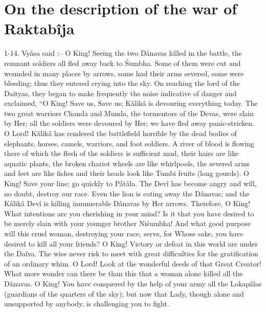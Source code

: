 ﻿\chapter{On the description of the war of Raktab\^ija}

1-14. Vy\^asa said :-- O King! Seeing the two D\^anavas killed in the battle, the remnant soldiers all fled away back to \'Sumbha. Some of them were cut and wounded in many places by arrows, some had their arms severed, some were bleeding; thus they entered crying into the sky. On reaching the lord of the Daityas, they began to make frequently the noise indicative of danger and exclaimed, ``O King! Save us, Save us; K\^alik\^a is devouring everything today. The two great warriors Chanda and Munda, the tormentors of the Devas, were slain by Her; all the soldiers were devoured by Her; we have fled away panic-stricken. O Lord! K\^alik\^a has rendered the battlefield horrible by the dead bodies of elephants, horses, camels, warriors, and foot soldiers. A river of blood is flowing there of which the flesh of the soldiers is sufficient mud, their hairs are like aquatic plants, the broken chariot wheels are like whirlpools, the severed arms and feet are like fishes and their heads look like Tumbi fruits (long gourds). O King! Save your line; go quickly to P\^at\^ala. The Dev\^i has become angry and will, no doubt, destroy our race. Even the lion is eating away the D\^anavas; and the K\^alik\^a Dev\^i is killing innumerable D\^anavas by Her arrows. Therefore, O King! What intentions are you cherishing in your mind? Is it that you have desired to be merely slain with your younger brother Ni\'sumbha! And what good purpose will this cruel woman, destroying your race, serve, for Whose sake, you have desired to kill all your friends? O King! Victory or defeat in this world are under the Da\^iva. The wise never risk to meet with great difficulties for the gratification of an ordinary whim. O Lord! Look at the wonderful deeds of that Great Creator! What more wonder can there be than this that a woman alone killed all the D\^anavas. O King! You have conquered by the help of your army all the Lokap\^alas (guardians of the quarters of the sky); but now that Lady, though alone and unsupported by anybody, is challenging you to fight.

